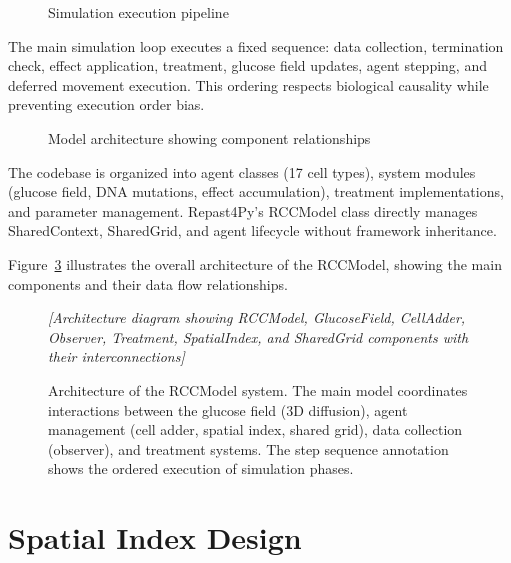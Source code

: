 \begin{figure}[htbp]
\centering
{}
\caption{Simulation execution pipeline}
\label{fig:simulation_pipeline}
\end{figure}

The main simulation loop executes a fixed sequence: data collection, termination check, effect application, treatment, glucose field updates, agent stepping, and deferred movement execution. This ordering respects biological causality while preventing execution order bias.

\begin{figure}[htbp]
\centering
{}
\caption{Model architecture showing component relationships}
\label{fig:model_architecture}
\end{figure}

The codebase is organized into agent classes (17 cell types), system modules (glucose field, DNA mutations, effect accumulation), treatment implementations, and parameter management. Repast4Py's RCCModel class directly manages SharedContext, SharedGrid, and agent lifecycle without framework inheritance.

Figure~\ref{fig:model_architecture} illustrates the overall architecture of the RCCModel, showing the main components and their data flow relationships.

\begin{figure}[htbp]
\centering
\textit{[Architecture diagram showing RCCModel, GlucoseField, CellAdder, Observer, Treatment, SpatialIndex, and SharedGrid components with their interconnections]}
\caption{Architecture of the RCCModel system. The main model coordinates interactions between the glucose field (3D diffusion), agent management (cell adder, spatial index, shared grid), data collection (observer), and treatment systems. The step sequence annotation shows the ordered execution of simulation phases.}
\label{fig:model_architecture}
\end{figure}

\section{Spatial Index Design}
\label{sec:spatial-index}

